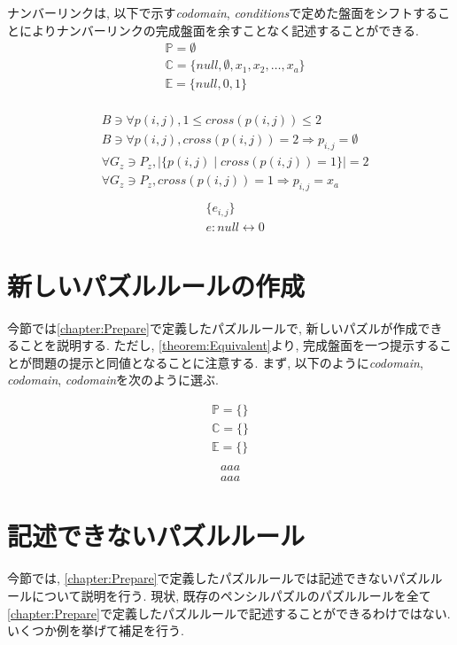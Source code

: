 \begin{example}[ナンバーリンクの数学的記述]
  ナンバーリンクは, 以下で示す\textit{codomain}, \textit{conditions}で定めた盤面をシフトすることによりナンバーリンクの完成盤面を余すことなく記述することができる.
  \begin{align}
     & \mathbb{P}=\emptyset                                         \\
     & \mathbb{C}=\{\textit{null}, \emptyset ,x_1,x_2,\ldots, x_a\} \\
     & \mathbb{E}=\{\textit{null},0,1\}                             \\
  \end{align}

  \begin{align}
     & B\ni \forall p(i,j),1\leq \textit{cross}(p(i,j))\leq 2                        \\
     & B\ni \forall p(i,j),  \textit{cross}(p(i,j))= 2 \Rightarrow p_{i,j}=\emptyset \\
     & \forall G_z\ni P_z,        |\{p(i,j)\mid cross(p(i,j))=1\}|=2                 \\
     & \forall G_z\ni P_z,     \textit{cross}(p(i,j))= 1 \Rightarrow p_{i,j}=x_a     \\
  \end{align}
  \begin{align}
     & \{e_{i,j}\}                      \\
     & e:\textit{null}\leftrightarrow 0
  \end{align}

\end{example}

\section{新しいパズルルールの作成}\label{section:NewPuzzleRule}
今節では\cref{chapter:Prepare}で定義したパズルルールで, 新しいパズルが作成できることを説明する. ただし, \cref{theorem:Equivalent}より, 完成盤面を一つ提示することが問題の提示と同値となることに注意する. まず, 以下のように\textit{codomain}, \textit{codomain}, \textit{codomain}を次のように選ぶ.

\begin{align}
  \mathbb{P}=\{\} \\
  \mathbb{C}=\{\} \\
  \mathbb{E}=\{\} \\
\end{align}
\begin{align}
  aaa
\end{align}
\begin{align}
  aaa
\end{align}


\section{記述できないパズルルール}\label{section:CannotDescribePuzzleRule}
今節では, \cref{chapter:Prepare}で定義したパズルルールでは記述できないパズルルールについて説明を行う.
現状, 既存のペンシルパズルのパズルルールを全て\cref{chapter:Prepare}で定義したパズルルールで記述することができるわけではない. いくつか例を挙げて補足を行う.
